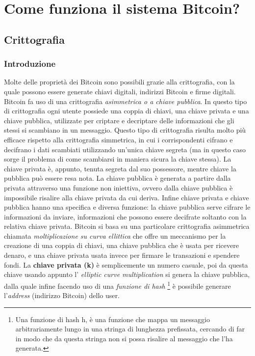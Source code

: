 
\chapter{Come funziona il sistema Bitcoin?}
\label{chap:basi}

\vspace*{1cm}

\section{Crittografia}
\subsection{Introduzione}
\label{sec:sezioni}
Molte delle propriet\`a dei Bitcoin sono possibili grazie alla crittografia, con la quale possono essere generate chiavi digitali, indirizzi Bitcoin e firme digitali.
Bitcoin fa uso di una crittografia \textit{asimmetrica o a chiave pubblica}.
In questo tipo di crittografia ogni utente possiede una coppia di chiavi, una chiave privata e una chiave pubblica, utilizzate per criptare e decriptare delle informazioni che gli stessi si scambiano in un messaggio. Questo tipo di crittografia risulta molto pi\`u efficace rispetto alla crittografia simmetrica, in cui i corrispondenti cifrano e decifrano i dati scambiati utilizzando un'unica chiave segreta (ma in questo caso sorge il problema
di come scambiarsi in maniera sicura la chiave stessa).
La chiave privata \`e, appunto, tenuta segreta dal suo possessore, mentre chiave la pubblica pu\`o essere resa nota. La chiave pubblica \`e generata a partire dalla privata attraverso una funzione non iniettiva, ovvero dalla chiave pubblica \`e impossibile risalire alla chiave privata da cui deriva. Infine chiave privata e chiave pubblica hanno una specifica e diversa funzione: la chiave pubblica serve cifrare le informazioni da
inviare, informazioni che possono essere decifrate soltanto con la relativa chiave privata. 
Bitcoin si basa su una particolare crittografia asimmetrica chiamata \textit{moltiplicazione su curva ellittica} che offre un meccanismo per la creazione di una coppia di chiavi, una chiave pubblica che \`e usata per ricevere denaro, e una chiave privata usata invece per firmare le transazioni e spendere fondi.
La \textbf{chiave privata (k)} \`e semplicemente un numero casuale, poi da questa chiave usando appunto l' \textit{elliptic curve multiplication} si genera la chiave pubblica, dalla quale infine facendo uso di una \textit{funzione di hash} \footnote{Una funzione di hash h, \`e una funzione che mappa un messaggio arbitrariamente lungo in una stringa di lunghezza prefissata, cercando di far in modo che da questa stringa non si possa risalire al messaggio che l'ha generata.} \`e possibile generare l'\textit{address} (indirizzo Bitcoin) dello user.\\
